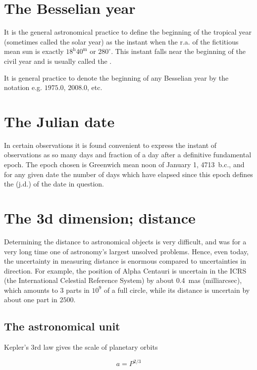 \section{The Besselian year}

It is the general astronomical practice to define the beginning of the tropical year
(sometimes called the solar year) as the instant when the {\sc r.a.} of the fictitious
mean sun is exactly $18^{\mathrm{h}}40^{\mathrm{m}}$ or $280^\circ$. This instant falls near the beginning of
the civil year and is usually called the {}. 

It is general practice to denote the beginning of any Besselian year by the notation
e.g. $1975.0$, $2008.0$, etc.

\section{The Julian date}

In certain observations it is found convenient to express the instant of observations
as so many days and fraction of a day after a definitive fundamental epoch. The epoch
chosen is Greenwich mean noon of January 1, 4713~{\sc b.c.}, and for any given date the
number of days which have elapsed since this epoch defines the {}
({\sc j.d.}) of the date in question.

\section{The 3d dimension; distance}

Determining the distance to astronomical objects is very difficult, and was for a very
long time one of astronomy's largest unsolved problems. Hence, even today, the uncertainty 
in measuring distance is enormous compared to uncertainties in direction. For example,
the position of Alpha Centauri is uncertain in the ICRS (the International Celestial Reference
System) by about 0.4~mas (milliarcsec), which amounts to 3 parts in $10^9$ of a full circle, while
its distance is uncertain by about one part in $2500$. 

\subsection{The astronomical unit}

Kepler's 3rd law gives the scale of planetary orbits

\[ a=P^{2/3} \]

